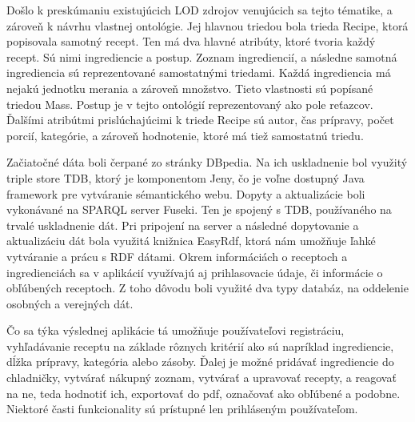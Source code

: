 Došlo k preskúmaniu existujúcich LOD zdrojov venujúcich sa tejto tématike, a
zároveň k návrhu vlastnej ontológie. Jej hlavnou triedou bola trieda Recipe, ktorá popisovala samotný recept. Ten má dva hlavné atribúty, ktoré tvoria každý recept. Sú
nimi ingrediencie a postup. Zoznam ingrediencií, a následne samotná ingrediencia sú
reprezentované samostatnými triedami. Každá ingrediencia má nejakú jednotku merania a zároveň množstvo. Tieto vlastnosti sú popísané triedou Mass. Postup je v tejto
ontológií reprezentovaný ako pole reťazcov. Ďalšími atribútmi prislúchajúcimi k triede
Recipe sú autor, čas prípravy, počet porcií, kategórie, a zároveň hodnotenie, ktoré má
tiež samostatnú triedu.

Začiatočné dáta boli čerpané zo stránky DBpedia. Na ich uskladnenie bol využitý
triple store TDB, ktorý je komponentom Jeny, čo je voľne dostupný Java framework
pre vytváranie sémantického webu. Dopyty a aktualizácie boli vykonávané na SPARQL
server Fuseki. Ten je spojený s TDB, používaného na trvalé uskladnenie dát. Pri pripojení na server a následné dopytovanie a aktualizáciu dát bola využitá knižnica EasyRdf,
ktorá nám umožňuje ľahké vytváranie a prácu s RDF dátami. Okrem informáciách o
receptoch a ingredienciách sa v aplikácií využívajú aj prihlasovacie údaje, či informácie
o obľúbených receptoch. Z toho dôvodu boli využité dva typy databáz, na oddelenie
osobných a verejných dát.

Čo sa týka výslednej aplikácie tá umožňuje používateľovi registráciu, vyhľadávanie receptu na základe rôznych kritérií ako sú napríklad ingrediencie, dĺžka prípravy,
kategória alebo zásoby. Ďalej je možné pridávať ingrediencie do chladničky, vytvárať
nákupný zoznam, vytvárať a upravovať recepty, a reagovať na ne, teda hodnotiť ich, exportovať do pdf, označovať ako obľúbené a podobne. Niektoré časti funkcionality sú
prístupné len prihláseným používateľom.


